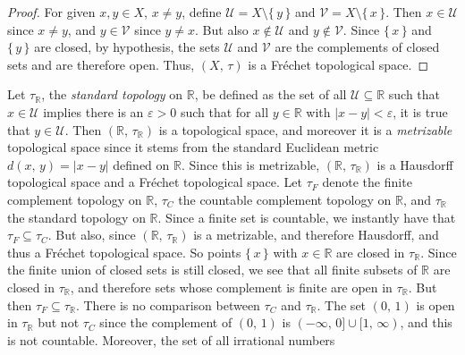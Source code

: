 \documentclass{article}
\theoremstyle{plain}
\theoremstyle{normal}
\newenvironment{example}{%
    \pushQED{\qed}\renewcommand{\qedsymbol}{$\blacksquare$}\examplex%
}{%
    \popQED\endexamplex%
}
\begin{document}
    \begin{proof}
        For given $x,y\in{X}$, $x\ne{y}$, define
        $\mathcal{U}=X\setminus\{\,y\,\}$ and $\mathcal{V}=X\setminus\{\,x\,\}$.
        Then $x\in\mathcal{U}$ since $x\ne{y}$, and
        $y\in\mathcal{V}$ since $y\ne{x}$. But also
        $x\notin\mathcal{U}$ and $y\notin\mathcal{V}$. Since
        $\{\,x\,\}$ and $\{\,y\,\}$ are closed, by hypothesis, the sets
        $\mathcal{U}$ and $\mathcal{V}$ are the complements of closed sets
        and are therefore open. Thus, $(X,\,\tau)$ is a Fr\'{e}chet topological
        space.
    \end{proof}
    \begin{example}[\textbf{Standard Topology on $\mathbb{R}$}]
        Let $\tau_{\mathbb{R}}$, the \textit{standard topology} on
        $\mathbb{R}$, be defined as the set of all
        $\mathcal{U}\subseteq\mathbb{R}$ such that $x\in\mathcal{U}$ implies
        there is an $\varepsilon>0$ such that for all $y\in\mathbb{R}$ with
        $|x-y|<\varepsilon$, it is true that $y\in\mathcal{U}$. Then
        $(\mathbb{R},\,\tau_{\mathbb{R}})$ is a topological space, and moreover
        it is a \textit{metrizable} topological space since it stems from the
        standard Euclidean metric $d(x,\,y)=|x-y|$ defined on $\mathbb{R}$.
        Since this is metrizable, $(\mathbb{R},\,\tau_{\mathbb{R}})$ is
        a Hausdorff topological space and a Fr\'{e}chet topological space.
    \end{example}
    Let $\tau_{F}$ denote the finite complement topology on $\mathbb{R}$,
    $\tau_{C}$ the countable complement topology on $\mathbb{R}$, and
    $\tau_{\mathbb{R}}$ the standard topology on $\mathbb{R}$. Since a finite
    set is countable, we instantly have that $\tau_{F}\subseteq\tau_{C}$.
    But also, since $(\mathbb{R},\,\tau_{\mathbb{R}})$ is a metrizable,
    and therefore Hausdorff, and thus a Fr\'{e}chet topological space.
    So points $\{\,x\,\}$ with $x\in\mathbb{R}$ are closed in
    $\tau_{\mathbb{R}}$. Since the finite union of closed sets is still closed,
    we see that all finite subsets of $\mathbb{R}$ are closed in
    $\tau_{\mathbb{R}}$, and therefore sets whose complement is finite are
    open in $\tau_{\mathbb{R}}$. But then
    $\tau_{F}\subseteq\tau_{\mathbb{R}}$. There is no comparison between
    $\tau_{C}$ and $\tau_{\mathbb{R}}$. The set
    $(0,\,1)$ is open in $\tau_{\mathbb{R}}$ but not $\tau_{C}$ since the
    complement of $(0,\,1)$ is $(-\infty,\,0]\cup[1,\,\infty)$, and this is
    not countable. Moreover, the set of all irrational numbers
\end{document}
